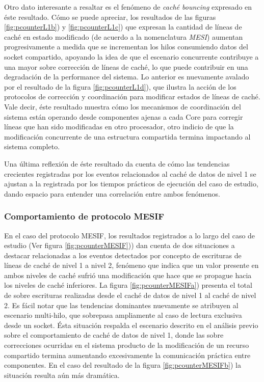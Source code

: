 Otro dato interesante a resaltar es el fenómeno de \emph{caché bouncing} expresado en éste resultado. Cómo se puede apreciar, los resultados de las figuras \ref{fig:pcounterL1b}) y \ref{fig:pcounterL1c}) que expresan la cantidad de líneas de caché en estado modificado (de acuerdo a la nomenclatura \emph{MESI}) aumentan progresivamente a medida que se incrementan los hilos consumiendo datos del socket compartido, apoyando la idea de que el escenario concurrente contribuye a una mayor sobre corrección de líneas de caché, lo que puede contribuir en una degradación de la performance del sistema. Lo anterior es nuevamente avalado por el resultado de la figura \ref{fig:pcounterL1d}), que ilustra la acción de los protocolos de corrección y coordinación para modificar estados de líneas de caché. Vale decir, éste resultado muestra cómo los mecanismos de coordinación del sistema están operando desde componentes ajenas a cada Core para corregir líneas que han sido modificadas en otro procesador, otro indicio de que la modificación concurrente de una estructura compartida termina impactando al sistema completo.

Una última reflexión de éste resultado da cuenta de cómo las tendencias crecientes registradas por los eventos relacionados al caché de datos de nivel 1 se ajustan a la registrada por los tiempos prácticos de ejecución del caso de estudio, dando espacio para entender una correlación entre ambos fenómenos.

\subsubsection{Comportamiento de protocolo MESIF}
En el caso del protocolo MESIF, los resultados registrados a lo largo del caso de estudio (Ver figura \ref{fig:pcounterMESIF})) dan cuenta de dos situaciones a destacar relacionadas a los eventos detectados por concepto de escrituras de líneas de caché de nivel 1 a nivel 2, fenómeno que indica que un valor presente en ambos niveles de caché sufrió una modificación que hace que se propague hacia los niveles de caché inferiores.
La figura \ref{fig:pcounterMESIFa}) presenta el total de sobre escrituras realizadas desde el caché de datos de nivel 1 al caché de nivel 2. Es fácil notar que las tendencias dominantes nuevamente se atribuyen al escenario multi-hilo, que sobrepasa ampliamente al caso de lectura exclusiva desde un socket. Ésta situación respalda el escenario descrito en el análisis previo sobre el comportamiento de caché de datos de nivel 1, donde las sobre correcciones ocurridas en el sistema producto de la modificación de un recurso compartido termina aumentando excesivamente la comunicación práctica entre componentes. En el caso del resultado de la figura \ref{fig:pcounterMESIFb}) la situación resulta aún más dramática. 

